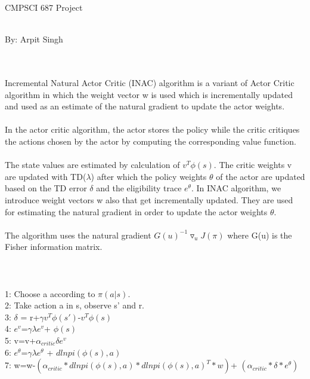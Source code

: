 \documentclass{article}
\begin{document}
\begin{center}
    \begin{Large}
    CMPSCI 687 Project
    \end{Large}
    \\
    By: Arpit Singh
\end{center}

 \\ \\Incremental Natural Actor Critic (INAC) algorithm is a variant of Actor Critic algorithm in which the weight vector w is used which is incrementally updated and used as an estimate of the natural gradient to update the actor weights. \\ \\
In the actor critic algorithm, the actor stores the policy while the critic critiques the actions chosen by the actor by computing the corresponding value function. \\ \\
The state values are estimated by calculation of $v^T \phi(s) $. The critic weights v are updated with TD($\lambda$) after which the policy weights $\theta$ of the actor are updated based on the TD error $\delta$ and the eligibility trace $e^{\theta}$. In INAC algorithm, we introduce weight vectors w also that get incrementally updated. They are used for estimating the natural gradient in order to update the actor weights $\theta$. \\ \\
The algorithm uses the natural gradient $G(u)^{-1}  \triangledown_u J(\pi) $ where G(u) is the Fisher information matrix.
\\\\
 \\ \\
1: Choose a according to $ \pi (a|s) $. \\ 
2: Take action a in s, observe s' and r. \\
3: $\delta$ = r+$\gamma v^T \phi(s')$-$v^T \phi(s) $ \\
4: $e^v$=$\gamma \lambda e^v$+ $\phi(s)$ \\
5: v=v+$\alpha_{critic}  \delta  e^v $ \\
6: $e^{\theta}$=$\gamma \lambda e^{\theta}$ + $dlnpi(\phi(s),a)$ \\
7: w=w-$( \alpha_{critic} * dlnpi(\phi(s),a) * dlnpi(\phi(s),a)^T * w)$+ $( \alpha_{critic} * \delta * e^{\theta} ) $ \\
\end{document}
